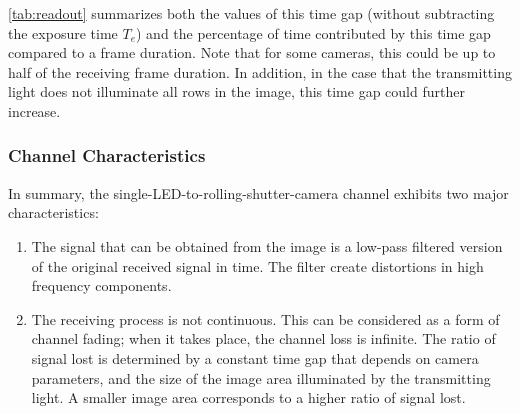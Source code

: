 \autoref{tab:readout} summarizes both the values of this time gap (without subtracting the exposure time $T_e$) and the percentage of time contributed by this time gap compared to a frame duration. Note that for some cameras, this could be up to half of the receiving frame duration. In addition, in the case that the transmitting light does not illuminate all rows in the image, this time gap could further increase. 

\subsubsection{Channel Characteristics}
In summary, the single-LED-to-rolling-shutter-camera channel exhibits two major characteristics:
\begin{enumerate}
  \item The signal that can be obtained from the image is a low-pass filtered version of the original received signal in time. The filter create distortions in high frequency components.
  \item The receiving process is not continuous. This can be considered as a form of channel fading; when it takes place, the channel loss is infinite. The ratio of signal lost is determined by a constant time gap that depends on camera parameters, and the size of the image area illuminated by the transmitting light. A smaller image area corresponds to a higher ratio of signal lost.
\end{enumerate}

